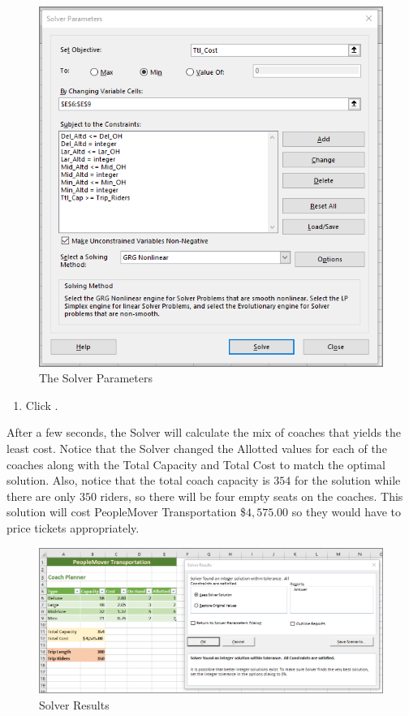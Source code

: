 \begin{figure}[H]
	\centering
	\includegraphics[width=\maxwidth{.95\linewidth}]{gfx/ch08_fig38}
	\caption{The Solver Parameters}
	\label{08:fig38}
\end{figure}

\begin{enumerate}[resume]	 
	 \item Click .
\end{enumerate}

After a few seconds, the Solver will calculate the mix of coaches that yields the least cost. Notice that the Solver changed the Allotted values for each of the coaches along with the Total Capacity and Total Cost to match the optimal solution. Also, notice that the total coach capacity is $ 354 $ for the solution while there are only $ 350 $ riders, so there will be four empty seats on the coaches. This solution will cost PeopleMover Transportation \$$ 4,575.00 $ so they would have to price tickets appropriately.

\begin{figure}[H]
	\centering
	\includegraphics[width=\maxwidth{.95\linewidth}]{gfx/ch08_fig39}
	\caption{Solver Results}
	\label{08:fig39}
\end{figure}

